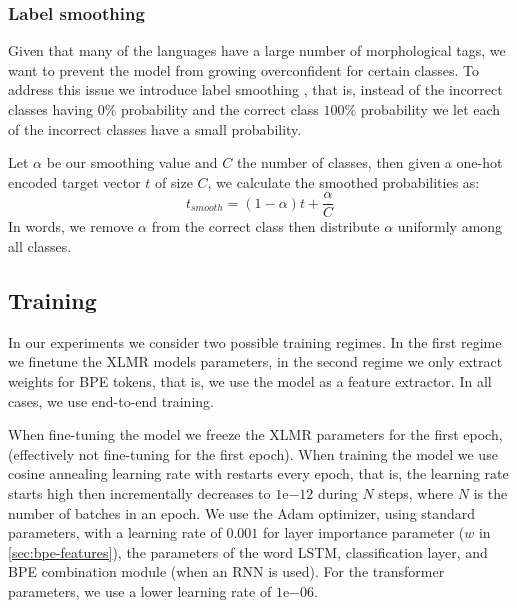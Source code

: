 \documentclass[11pt]{article}
\newcommand\jp[1]{(\textbf{JP:} #1)}
\begin{document}
	\subsubsection{Label smoothing}
    	Given that many of the languages have a large number of
     morphological tags, we want to prevent the model from growing
     overconfident for certain classes. To address this issue we
     introduce label smoothing \cite{szegedy2016rethinking}, that is,
     instead of the incorrect classes having $0\%$ probability and the
     correct class $100\%$ probability we let each of the incorrect
     classes have a small probability.


     Let $\alpha$ be our smoothing value and $C$ the number of
     classes, then given a one-hot encoded target vector $t$ of size
     $C$, we calculate the smoothed probabilities as:
    \begin{equation}
        t_{smooth} = (1-\alpha)t + \frac{\alpha}{C}
    \end{equation}
    In words, we remove $\alpha$ from the correct class then
    distribute $\alpha$ uniformly among all classes.

     \subsection{Training}

	
     In our experiments we consider two possible training regimes. In
     the first regime we finetune the XLMR models parameters, in the
     second regime we only extract weights for BPE tokens, that is, we
     use the model as a feature extractor. In all cases, we use
     end-to-end training.
     
     When fine-tuning the model we freeze the XLMR parameters for the
     first epoch, (effectively not fine-tuning for the first epoch).
     When training the model we use cosine annealing learning rate
     with restarts every epoch, that is, the learning rate starts high
     then incrementally decreases to $1\mathrm{e}{-12}$ during $N$
     steps, where $N$ is the number of batches in an epoch. We use the
     Adam optimizer, using standard parameters, with a learning rate of $0.001$ for layer
     importance parameter ($w$ in \cref{sec:bpe-features}), the
     parameters of the word LSTM, classification layer, and BPE
     combination module (when an RNN is used). For the transformer
     parameters, we use a lower learning rate of $1\mathrm{e}{-06}$.
\end{document}

